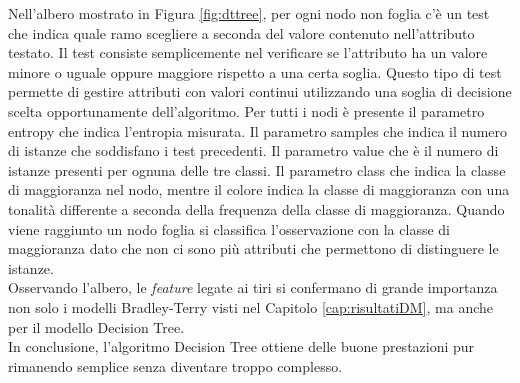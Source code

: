 Nell'albero mostrato in Figura \ref{fig:dttree}, per ogni nodo non foglia c'è un test che indica quale ramo scegliere a seconda del valore contenuto nell'attributo testato. Il test consiste semplicemente nel verificare se l'attributo ha un valore minore o uguale oppure maggiore rispetto a una certa soglia. Questo tipo di test permette di gestire attributi con valori continui utilizzando una soglia di decisione scelta opportunamente dell'algoritmo. Per tutti i nodi è presente il parametro \textsf{entropy} che indica l'entropia misurata. Il parametro \textsf{samples} che indica il numero di istanze che soddisfano i test precedenti. Il parametro \textsf{value} che è il numero di istanze presenti per ognuna delle tre classi. Il parametro \textsf{class} che indica la classe di maggioranza nel nodo, mentre il colore indica la classe di maggioranza con una tonalità differente a seconda della frequenza della classe di maggioranza. Quando viene raggiunto un nodo foglia si classifica l'osservazione con la classe di maggioranza dato che non ci sono più attributi che permettono di distinguere le istanze.\\
Osservando l'albero, le \emph{feature} legate ai tiri si confermano di grande importanza non solo i modelli Bradley-Terry visti nel Capitolo \ref{cap:risultatiDM}, ma anche per il modello Decision Tree.\\
In conclusione, l'algoritmo Decision Tree ottiene delle buone prestazioni pur rimanendo semplice senza diventare troppo complesso.


